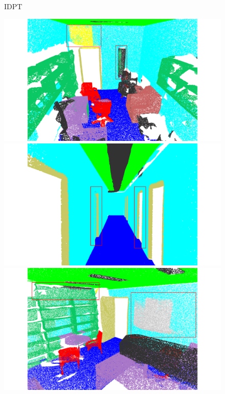 \begin{figure}[htbp]
    \begin{minipage}{0.09\textwidth}
        \centering
        IDPT
    \end{minipage}
    \hfill
    \begin{minipage}{0.22\textwidth}
        \centering
        \includegraphics[width=\textwidth]{fig/supplement/semantic_segmentation/office_9/IDPT_office_9.pdf}
    \end{minipage}
    \hfill
    \begin{minipage}{0.22\textwidth}
        \centering
        \includegraphics[width=\textwidth]{fig/supplement/semantic_segmentation/hallway_10/IDPT_hallway_10.pdf}
    \end{minipage}
    \hfill
    \begin{minipage}{0.22\textwidth}
        \centering
        \includegraphics[width=\textwidth]{fig/supplement/semantic_segmentation/office_35/IDPT_office_35.pdf}

\end{minipage}
\end{figure}
